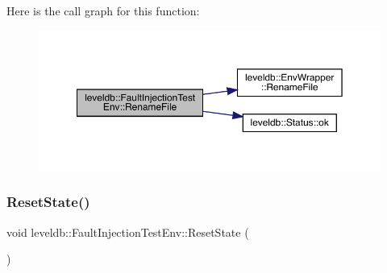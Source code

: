Here is the call graph for this function\+:
\nopagebreak
\begin{figure}[H]
\begin{center}
\leavevmode
\includegraphics[width=350pt]{classleveldb_1_1_fault_injection_test_env_ac283e671532ee024cf22f84b95680061_cgraph}
\end{center}
\end{figure}
\mbox{\label{classleveldb_1_1_fault_injection_test_env_ae4f5f304ef1ae31a3da13efec88601f6}} 
\subsubsection{\texorpdfstring{ResetState()}{ResetState()}}
{\footnotesize\ttfamily void leveldb\+::\+Fault\+Injection\+Test\+Env\+::\+Reset\+State (\begin{DoxyParamCaption}{ }\end{DoxyParamCaption})}

